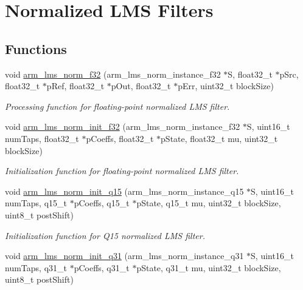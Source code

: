 \hypertarget{group__LMS__NORM}{}\section{Normalized L\+MS Filters}
\label{group__LMS__NORM}
\subsection*{Functions}
\begin{DoxyCompactItemize}
\item 
void \hyperlink{group__LMS__NORM_ga2418c929087c6eba719758eaae3f3300}{arm\+\_\+lms\+\_\+norm\+\_\+f32} (arm\+\_\+lms\+\_\+norm\+\_\+instance\+\_\+f32 $\ast$S, float32\+\_\+t $\ast$p\+Src, float32\+\_\+t $\ast$p\+Ref, float32\+\_\+t $\ast$p\+Out, float32\+\_\+t $\ast$p\+Err, uint32\+\_\+t block\+Size)
\begin{DoxyCompactList}\small\item\em Processing function for floating-\/point normalized L\+MS filter. \end{DoxyCompactList}\item 
void \hyperlink{group__LMS__NORM_gac7ccbaea863882056eee815456464670}{arm\+\_\+lms\+\_\+norm\+\_\+init\+\_\+f32} (arm\+\_\+lms\+\_\+norm\+\_\+instance\+\_\+f32 $\ast$S, uint16\+\_\+t num\+Taps, float32\+\_\+t $\ast$p\+Coeffs, float32\+\_\+t $\ast$p\+State, float32\+\_\+t mu, uint32\+\_\+t block\+Size)
\begin{DoxyCompactList}\small\item\em Initialization function for floating-\/point normalized L\+MS filter. \end{DoxyCompactList}\item 
void \hyperlink{group__LMS__NORM_ga213ab1ee2e154cc2fa30d667b1994b89}{arm\+\_\+lms\+\_\+norm\+\_\+init\+\_\+q15} (arm\+\_\+lms\+\_\+norm\+\_\+instance\+\_\+q15 $\ast$S, uint16\+\_\+t num\+Taps, q15\+\_\+t $\ast$p\+Coeffs, q15\+\_\+t $\ast$p\+State, q15\+\_\+t mu, uint32\+\_\+t block\+Size, uint8\+\_\+t post\+Shift)
\begin{DoxyCompactList}\small\item\em Initialization function for Q15 normalized L\+MS filter. \end{DoxyCompactList}\item 
void \hyperlink{group__LMS__NORM_ga1d9659dbbea4c89a7a9d14d5fc0dd490}{arm\+\_\+lms\+\_\+norm\+\_\+init\+\_\+q31} (arm\+\_\+lms\+\_\+norm\+\_\+instance\+\_\+q31 $\ast$S, uint16\+\_\+t num\+Taps, q31\+\_\+t $\ast$p\+Coeffs, q31\+\_\+t $\ast$p\+State, q31\+\_\+t mu, uint32\+\_\+t block\+Size, uint8\+\_\+t post\+Shift)

\end{DoxyCompactItemize}
